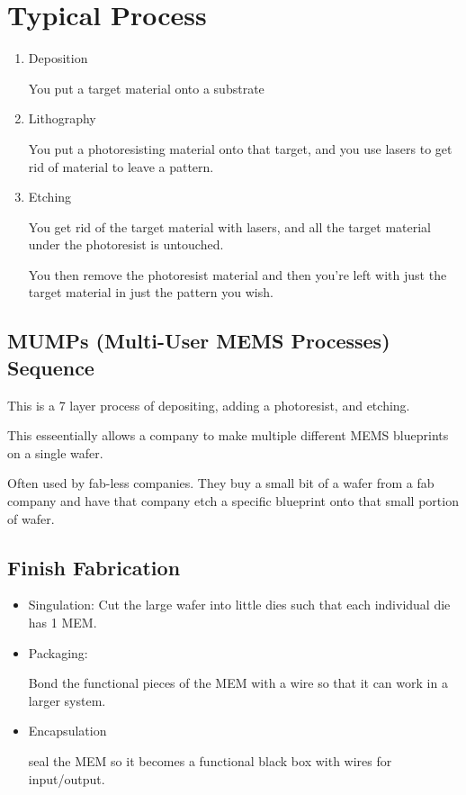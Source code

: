 \documentclass[fleqn]{report}
\begin{document}
\section{Typical Process}
\begin{enumerate}
    \item 
    Deposition
    
    You put a target material onto a substrate
    \item 
    Lithography

    You put a photoresisting material onto that target, and you 
    use lasers to get rid of material to leave a pattern. 
    \item 
    Etching 

    You get rid of the target material with lasers, and all the target 
    material under the photoresist is untouched. 

    You then remove the photoresist material and then you're left with 
    just the target material in just the pattern you wish. 
\end{enumerate}


\subsection{MUMPs (Multi-User MEMS Processes) Sequence}
This is a 7 layer process of depositing, adding a photoresist, and etching. 

This esseentially allows a company to make multiple different MEMS blueprints 
on a single wafer. 

Often used by fab-less companies. They buy a small bit of a wafer from a 
fab company and have that company etch a specific blueprint onto that 
small portion of wafer. 

\subsection{Finish Fabrication}
\begin{itemize}
    \item 
Singulation: Cut the large wafer 
into little dies such that each individual die has 1 MEM.
    \item 
    Packaging: 

    Bond the functional pieces of the MEM with a wire so that it can 
    work in a larger system. 
    \item 
    Encapsulation

    seal the MEM so it becomes a functional black box with wires for 
    input/output.
\end{itemize}
\end{document}
